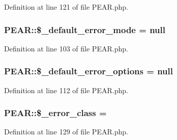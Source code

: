 Definition at line 121 of file P\+E\+A\+R.\+php.

\hypertarget{classPEAR_a6b3ff3d78a7b1d62c0de6b1190046a89}{}
\subsubsection[{\$\+\_\+default\+\_\+error\+\_\+mode}]{\setlength{\rightskip}{0pt plus 5cm}P\+E\+A\+R\+::\$\+\_\+default\+\_\+error\+\_\+mode = null}\label{classPEAR_a6b3ff3d78a7b1d62c0de6b1190046a89}


Definition at line 103 of file P\+E\+A\+R.\+php.

\hypertarget{classPEAR_ac71147b819daa267f29980e941efa23c}{}
\subsubsection[{\$\+\_\+default\+\_\+error\+\_\+options}]{\setlength{\rightskip}{0pt plus 5cm}P\+E\+A\+R\+::\$\+\_\+default\+\_\+error\+\_\+options = null}\label{classPEAR_ac71147b819daa267f29980e941efa23c}


Definition at line 112 of file P\+E\+A\+R.\+php.

\hypertarget{classPEAR_a6519b9822433b9dc3db0def7508e2b61}{}
\subsubsection[{\$\+\_\+error\+\_\+class}]{\setlength{\rightskip}{0pt plus 5cm}P\+E\+A\+R\+::\$\+\_\+error\+\_\+class = \textquotesingle{}}\label{classPEAR_a6519b9822433b9dc3db0def7508e2b61}


Definition at line 129 of file P\+E\+A\+R.\+php.

\hypertarget{classPEAR_ae20c719eaa8316ed0bd6cc83eaa6d0ac}{}
